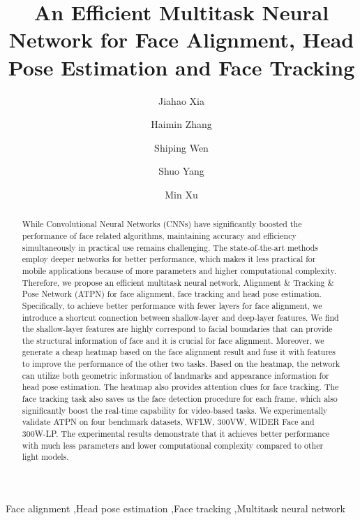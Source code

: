 \documentclass[3p,twocolumn, round, sort & compress]{elsarticle}
\begin{document}
\begin{frontmatter}



\title{An Efficient Multitask Neural Network for Face Alignment, Head Pose Estimation and Face Tracking}


\author{Jiahao Xia }

\author{Haimin Zhang}

\author{Shiping Wen}

\author{Shuo Yang}

\author{ Min Xu }


\address{School of Electrical and Data Engineering, Faculty of Engineering and IT, University of Technology Sydney }
\address{15 Broadway, Ultimo, NSW 2007, Australia}


\begin{abstract}
While Convolutional Neural Networks (CNNs) have significantly boosted the performance of face related algorithms, maintaining accuracy and efficiency simultaneously in practical use remains challenging. The state-of-the-art methods employ deeper networks for better performance, which makes it less practical for mobile applications because of more parameters and higher computational complexity. Therefore, we propose an efficient multitask neural network, Alignment \& Tracking \& Pose Network (ATPN) for face alignment, face tracking and head pose estimation. Specifically, to achieve better performance with fewer layers for face alignment, we introduce a shortcut connection between shallow-layer and deep-layer features. We find the shallow-layer features are highly correspond to facial boundaries that can provide the structural information of face and it is crucial for face alignment. Moreover, we generate a cheap heatmap based on the face alignment result and fuse it with features to improve the performance of the other two tasks. Based on the heatmap, the network can utilize both geometric information of landmarks and appearance information for head pose estimation. The heatmap also provides attention clues for face tracking. The face tracking task also saves us the face detection procedure for each frame, which also significantly boost the real-time capability for video-based tasks. We experimentally validate ATPN on four benchmark datasets, WFLW, 300VW, WIDER Face and 300W-LP. The experimental results demonstrate that it achieves better performance with much less parameters and lower computational complexity compared to other light models.
\end{abstract}

\begin{keyword}
Face alignment \sep Head pose estimation \sep Face tracking \sep Multitask neural network
\end{keyword}

\end{frontmatter}
\end{document}
